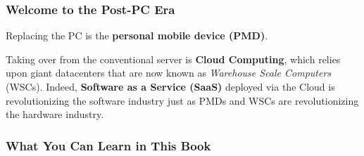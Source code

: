 \documentclass[a4paper,12pt,twoside,openany]{book}
\begin{document}
\subsubsection{Welcome to the Post-PC Era}

Replacing the PC is the \textbf{personal mobile device (PMD)}.

Taking over from the conventional server is \textbf{Cloud Computing}, which relies upon giant datacenters that are now known as \textit{Warehouse Scale Computers} (WSCs). Indeed, \textbf{Software as a Service (SaaS)} deployed via the Cloud is revolutionizing the software industry just as PMDs and WSCs are revolutionizing the hardware industry.

\subsubsection{What You Can Learn in This Book}

\end{document}
